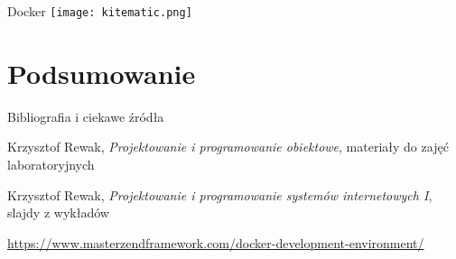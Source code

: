\begin{frame}{Docker}
	\centering
	\texttt{[image: kitematic.png]}
\end{frame}

\section{Podsumowanie}

\begin{frame}{Bibliografia i ciekawe źródła}
  
	\begin{thebibliography}{9}
	
		Krzysztof Rewak,
		\textit{Projektowanie i programowanie obiektowe},
		materiały do zajęć laboratoryjnych
	
		Krzysztof Rewak,
		\textit{Projektowanie i programowanie systemów internetowych I},
		slajdy z wykładów
		
		\url{https://www.masterzendframework.com/docker-development-environment/}
	
	\end{thebibliography}

\end{frame}


